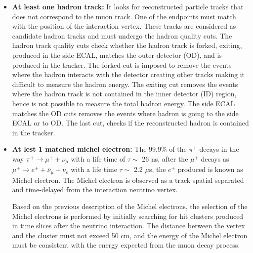 \begin{itemize}
    \item \textbf{At least one hadron track:} It looks for reconstructed particle tracks that does not correspond to the muon track. One of the endpoints must match with the position of the interaction vertex. These tracks are considered as candidate hadron tracks and must undergo the hadron quality cuts. The hadron track quality cuts check whether the hadron track is forked, exiting, produced in the side ECAL, matches the outer detector (OD), and is produced in the tracker. The forked cut is imposed to remove the events where the hadron interacts with the detector creating other tracks making it difficult to measure the hadron energy. The exiting cut removes the events where the hadron track is not contained in the  inner detector (ID) region, hence is not possible to measure the total hadron energy. The side ECAL matches the OD cuts removes the events where hadron is going to the side ECAL or to OD. The last cut, checks if the reconstructed hadron is contained in the tracker.
    \item \textbf{At lest 1 matched michel electron:} The 99.9\% of the $\pi^+$ decays in the way $\pi^+\xrightarrow{}\mu^+ + \nu_\mu$ with a life time of $\tau \sim$ 26 ns, after the $\mu^+$ decays as $\mu^+\xrightarrow{} e^+ + \overline{\nu}_\mu + \nu_e$ with a life time $\tau\sim$ 2.2 \(\mu\)s, the $e^+$ produced is known as Michel electron. The Michel electron is observed as a track spatial separated and time-delayed from the interaction neutrino vertex. 

    Based on the previous description of the Michel electrons, the selection of the Michel electrons is performed by initially searching for hit clusters produced in time slices after the neutrino interaction. The distance between the vertex and the cluster must not exceed 50 cm, and the energy of the Michel electron must be consistent with the energy expected from the muon decay process.  


\end{itemize}
